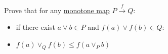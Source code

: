 Prove that for any \hyperref[D1.59]{monotone map} $P \xrightarrow{f} Q$:
    \begin{itemize}
      \item if there exist $a \lor b \in P$ and $f(a) \lor f(b) \in Q$:
      \item $f(a) \lor_Q f(b) \leq f(a \lor_P b)$
    \end{itemize}
